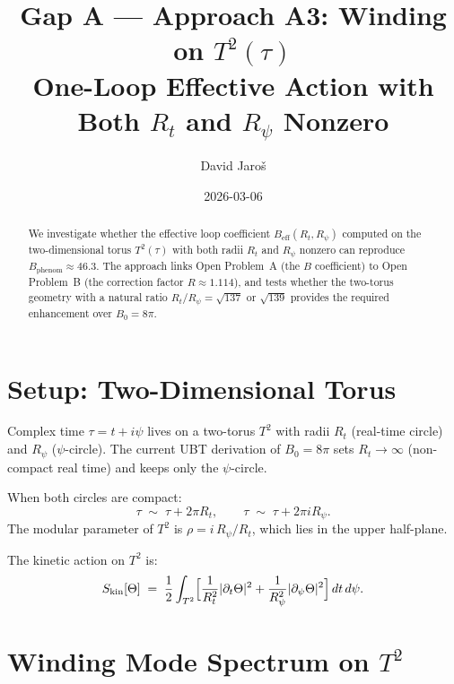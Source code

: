 \documentclass[12pt,a4paper]{article}
\title{\textbf{Gap A --- Approach A3: Winding on $T^2(\tau)$}\\
         \large One-Loop Effective Action with Both $R_t$ and $R_\psi$ Nonzero}
\author{David Jaro\v{s}}
\date{2026-03-06}
\theoremstyle{definition}
\theoremstyle{remark}
\begin{document}
  \maketitle

  \begin{abstract}
  We investigate whether the effective loop coefficient
  $B_{\mathrm{eff}}(R_t, R_\psi)$ computed on the two-dimensional torus
  $T^2(\tau)$ with both radii $R_t$ and $R_\psi$ nonzero can reproduce
  $B_{\mathrm{phenom}} \approx 46.3$.  The approach links Open Problem~A
  (the $B$ coefficient) to Open Problem~B (the correction factor
  $R \approx 1.114$), and tests whether the two-torus geometry with a
  natural ratio $R_t/R_\psi = \sqrt{137}$ or $\sqrt{139}$ provides the
  required enhancement over $B_0 = 8\pi$.
  \end{abstract}
\fi

\section{Setup: Two-Dimensional Torus}
\label{sec:setup}

Complex time $\tau = t + i\psi$ lives on a two-torus $T^2$ with radii
$R_t$ (real-time circle) and $R_\psi$ ($\psi$-circle).  The current UBT
derivation of $B_0 = 8\pi$ sets $R_t \to \infty$ (non-compact real time)
and keeps only the $\psi$-circle.

When both circles are compact:
\begin{equation}
  \tau \;\sim\; \tau + 2\pi R_t, \qquad
  \tau \;\sim\; \tau + 2\pi i R_\psi.
\end{equation}
The modular parameter of $T^2$ is $\rho = i\,R_\psi/R_t$, which lies in
the upper half-plane.

The kinetic action on $T^2$ is:
\begin{equation}
  S_{\mathrm{kin}}[\Theta]
  \;=\; \frac{1}{2}\int_{T^2} \Bigl[
      \frac{1}{R_t^2}|\partial_t\Theta|^2
    + \frac{1}{R_\psi^2}|\partial_\psi\Theta|^2
  \Bigr]\,dt\,d\psi.
\end{equation}

\section{Winding Mode Spectrum on $T^2$}
\label{sec:spectrum}
\end{document}
